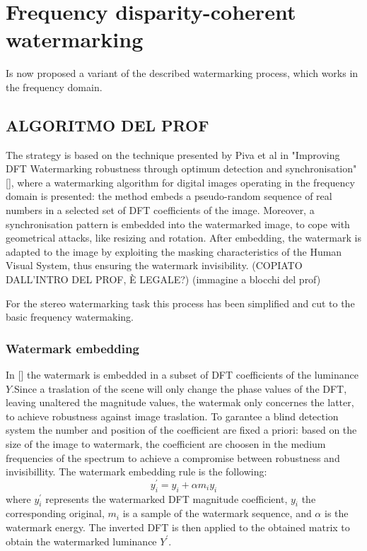 \chapter{Frequency disparity-coherent watermarking}
\label{dft}


Is now proposed a variant of the described watermarking process, which works in the frequency domain.

\section{ALGORITMO DEL PROF}

The strategy is based on the technique presented by Piva et al in "Improving DFT Watermarking robustness through optimum detection and synchronisation" [], where a watermarking algorithm for digital images operating in the frequency domain is presented: the method embeds a pseudo-random sequence of real numbers in a selected set of DFT coefficients of the image. Moreover, a synchronisation pattern is embedded into the watermarked image, to cope with geometrical attacks, like resizing and rotation. After embedding, the watermark is adapted to the image by exploiting the masking characteristics of the Human Visual System, thus ensuring the watermark invisibility. (COPIATO DALL'INTRO DEL PROF, È LEGALE?)\newline
(immagine a blocchi del prof)

For the stereo watermarking task this process has been simplified and cut to the basic frequency watermaking.

\subsection{Watermark embedding}

In [] the watermark is embedded in a subset of DFT coefficients of the luminance $Y$.\newline Since a traslation of the scene will only change the phase values of the DFT, leaving unaltered the magnitude values, the watermak only concernes the latter, to achieve robustness against image traslation.\newline
To garantee a blind detection system the number and position of the coefficient are fixed a priori: based on the size of the image to watermark, the coefficient are choosen in the medium frequencies of the spectrum to achieve a compromise between robustness and invisibillity.\newline 
The watermark embedding rule is the following:
$$y_{i}^{'} = y_{i}+\alpha m_{i}y_{i} $$
where $y_{i}^{'}$ represents the watermarked DFT magnitude coefficient, $y_{i}$ the corresponding original, $m_{i}$ is a sample of the watermark sequence, and $\alpha$ is the watermark energy.\newline
The inverted DFT is then applied to the obtained matrix to obtain the watermarked luminance $Y^{'}$.

